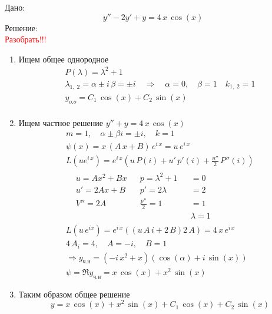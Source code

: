 \begin{Example}
	Дано: 
    \[
        y'' - 2y' + y = 4\,x\,\cos(x)
    \]
    Решение:\\
    \textcolor{red}{Разобрать!!!}\\
	\begin{enumerate}
        \item Ищем общее однородное
        \begin{gather*}
            P(\lambda) = \lambda^2 + 1\\
            \lambda_{1,\;2} = \alpha \pm i\,\beta = \pm i \quad \Rightarrow \quad \alpha = 0,\quad \beta = 1 \quad k_{1,\;2} = 1\\
            y_{o.o} = C_1\,\cos(x) + C_2\,\sin(x)\\    
        \end{gather*}
        
        \item Ищем частное решение $y'' + y = 4\,x\,\cos(x)$
        \begin{gather*}
            m=1,\quad \alpha \pm \beta i = \pm i,\quad k=1\\
            \psi(x) = x\,(A\,x + B)\,e^{i\,x} = u\,e^{i\,x}\\
            L(ue^{i\,x}) = e^{i\,x}(u\,P(i) + u'\,p'(i) + \frac{u''}{2}\,P''(i))\\
            \begin{align*}
                &u = Ax^2 + Bx && p=\lambda^2 + 1 && =0\\
                &u' = 2Ax + B && p'=2\lambda && =2\\
                &V'' = 2A && \frac{p''}{2}=1 && = 1\\
                &&&&& \lambda = 1
            \end{align*}\\
            L(u\,e^{ix}) = e^{i\,x}((u\,A\,i + 2\,B)2\,A) = 4\,x\,e^{i\,x}\\
            4\,A_i = 4,\quad A = -i, \quad B = 1\\
            \Rightarrow y_{ч.н} = (-i\,x^2 + x)(\cos( \alpha) + i\,\sin(x))\\
            \psi = \Re y_{ч.н} = x\,\cos(x) + x^2\,\sin(x)
        \end{gather*}
        \item Таким образом общее решение
        \[
            y = x\,\cos(x) + x^2\,\sin(x) + C_1\,\cos(x) + C_2\,\sin(x)
        \] 
    \end{enumerate}
\end{Example}